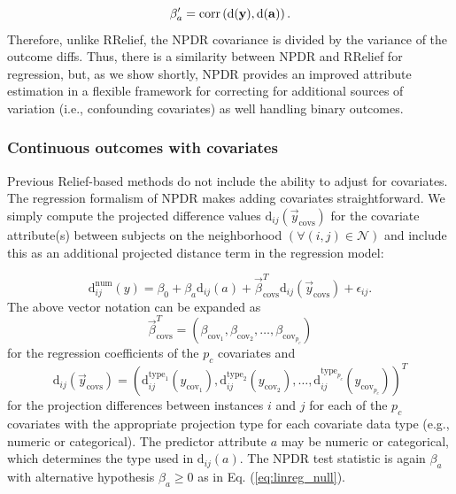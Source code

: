 \documentclass[10pt]{article}
\begin{document}
\begin{equation}
\beta'_a = \text{corr}\left( \bf{\text{d}}(\bf{y}), \bf{\text{d}}(\bf{a}) \right).
\end{equation}
Therefore, unlike RRelief, the NPDR covariance is divided by the variance of the outcome diffs. Thus, there is a similarity between NPDR and RRelief for regression, but, as we show shortly, NPDR provides an improved attribute estimation in a flexible framework for correcting for additional sources of variation (i.e., confounding covariates) as well handling binary outcomes.   


\subsubsection{Continuous outcomes with covariates}
Previous Relief-based methods do not include the ability to adjust for covariates. The regression formalism of NPDR makes adding covariates straightforward. We simply compute the projected difference values $\text{d}_{ij}(\vec{y}_{\text{covs}})$ for the covariate attribute(s) between subjects on the neighborhood $(\forall(i,j) \in \mathcal{N})$ and include this as an additional projected distance term in the regression model:

\begin{equation}\label{eq:lin_reg_cov}
    \text{d}^{\text{num}}_{ij}(y) = \beta_{0} + \beta_{a} \text{d}_{ij}(a) + \vec{\beta}^{T}_{\text{covs}}\text{d}_{ij}(\vec{y}_{\text{covs}}) + \epsilon_{ij}.
\end{equation}
The above vector notation can be expanded as  
\begin{equation}
\vec{\beta}^{T}_{\text{covs}} = \left( \beta_{\text{cov}_1}, \beta_{\text{cov}_2}, \ldots,  \beta_{\text{cov}_{p_c}} \right)
\end{equation}
for the regression coefficients of the $p_c$ covariates and 
\begin{equation}
\text{d}_{ij}(\vec{y}_\text{covs})= \left( \text{d}^{\text{type}_1}_{ij}({y}_{\text{cov}_1}), \text{d}^{\text{type}_2}_{ij}({y}_{\text{cov}_2}), \ldots, \text{d}^{\text{type}_{p_c}}_{ij}({y}_{\text{cov}_{p_c}}) \right)^{T}
\end{equation}
for the projection differences between instances $i$ and $j$ for each of the $p_c$ covariates with the appropriate projection type for each covariate data type (e.g., numeric or categorical). The predictor attribute $a$ may be numeric or categorical, which determines the type used in $\text{d}_{ij}(a)$. The NPDR test statistic is again $\beta_a$ with alternative hypothesis $\beta_a \ge 0$ as in Eq. (\ref{eq:linreg_null}). 
\end{document}
